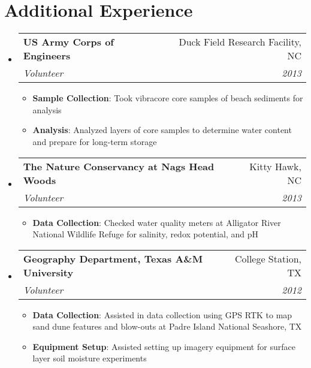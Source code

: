 \documentclass[letterpaper,11pt]{article}
\makeatletter
\newcommand{\resumeItem}[2]{
  \item\small{
    \textbf{#1}{: #2 \vspace{-2pt}}
  }
}
\newcommand{\resumeSubheading}[4]{
  \vspace{-1pt}\item
    \begin{tabular*}{0.97\textwidth}[t]{l@{\extracolsep{\fill}}r}
      \textbf{#1} & #2 \\
      \textit{\small#3} & \textit{\small #4} \\
    \end{tabular*}\vspace{-5pt}
}
\newcommand{\resumeSubHeadingListStart}{\begin{itemize}[leftmargin=*]}
\newcommand{\resumeSubHeadingListEnd}{\end{itemize}}
\newcommand{\resumeItemListStart}{\begin{itemize}}
\newcommand{\resumeItemListEnd}{\end{itemize}\vspace{-5pt}}
\makeatother
\begin{document}
\section{Additional Experience}
  \resumeSubHeadingListStart

 \resumeSubheading
      {US Army Corps of Engineers}{Duck Field Research Facility, NC}
      {Volunteer}{2013}
      \resumeItemListStart
      		\resumeItem{Sample Collection}
      		{Took vibracore core samples of beach sediments for analysis}
      		\resumeItem{Analysis}
      		{Analyzed layers of core samples to determine water content and prepare for long-term storage}
      \resumeItemListEnd
      
      
    \resumeSubheading
      {The Nature Conservancy at Nags Head Woods}{Kitty Hawk, NC}
      {Volunteer}{2013}
      \resumeItemListStart
        \resumeItem{Data Collection}
          {Checked water quality meters at Alligator River National Wildlife Refuge for salinity, redox potential, and pH}\\
      \resumeItemListEnd
      
     \resumeSubheading
      {Geography Department, Texas A\&M University}{College Station, TX}
      {Volunteer}{2012}
     \resumeItemListStart
     \resumeItem{Data Collection}
     {Assisted in data collection using GPS RTK to map sand dune features and blow-outs at Padre Island National Seashore, TX}
	 \resumeItem{Equipment Setup}
	 {Assisted setting up imagery equipment for surface layer soil moisture experiments}
	 \resumeItemListEnd
 
      
      
\resumeSubHeadingListEnd
\end{document}
